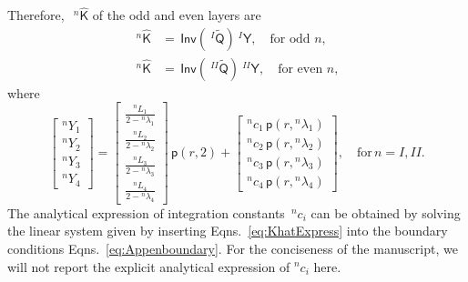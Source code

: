 \documentclass[preprint,10pt,times]{elsarticle}
\numberwithin{equation}{section}
\renewcommand{\u}[1]{\boldsymbol{#1}}
\newcommand{\usf}[1]{\u{\mathsf #1}}
\newcommand{\pr}[1]{\left( #1 \right)}
\newcommand{\p}{\,\mathsf{p}}
\newcommand{\Inv}{\,\mathsf{Inv}}
\renewcommand{\>}{$\Rightarrow$}
\begin{document}
Therefore,~$~^{n}{\hat{\usf{K}}}$ of the odd and even layers are
\begin{subequations}
\begin{align}
~^{n}{\hat{\usf{K}}} & = \Inv\left( ~^{I}\tilde{\usf{Q}} \right) ~^{I}\usf{Y}, \quad \text{for odd~$n$}, \\
~^{n}{\hat{\usf{K}}} & = \Inv\left( ~^{II}\tilde{\usf{Q}} \right) ~^{II}\usf{Y}, \quad \text{for even~$n$},
\end{align}
\label{eq:KhatExpress}
\end{subequations}
where
\begin{equation}
	\begin{bmatrix}
	 {}^{n}\!{Y_{1}} \\ {}^{n}\!{Y_{2}} \\ {}^{n}\!{Y_{3}} \\ {}^{n}\!{Y_{4}}
	\end{bmatrix}
	=
	\begin{bmatrix}
	 \frac{{}^{n}\!{L_{1}}}{2-{}^{n}\!{\lambda_{1}}} \\ \frac{{}^{n}\!{L_{2}}}{2-{}^{n}\!{\lambda_{2}}} \\ \frac{{}^{n}\!{L_{3}}}{2-{}^{n}\!{\lambda_{3}}} \\ \frac{{}^{n}\!{L_{4}}}{2-{}^{n}\!{\lambda_{4}}}
	\end{bmatrix}\p\pr{r,2}
	+
	\begin{bmatrix}
	 {}^{n}\!{c_{1}} \p\pr{r,{}^{n}\!{\lambda_{1}}} \\ {}^{n}\!{c_{2}} \p\pr{r,{}^{n}\!{\lambda_{2}}} \\ {}^{n}\!{c_{3}} \p\pr{r,{}^{n}\!{\lambda_{3}}} \\ {}^{n}\!{c_{4}} \p\pr{r,{}^{n}\!{\lambda_{4}}}
	\end{bmatrix}, \quad \text{for} \, n = I, II.
\end{equation}
The analytical expression of integration constants~${}^{n}\!{c_{i}}$ can be obtained by solving the linear system given by inserting Eqns.~\eqref{eq:KhatExpress} into the boundary conditions Eqns.~\eqref{eq:Appenboundary}. For the conciseness of the manuscript, we will not report the explicit analytical expression of ${}^{n}\!{c_{i}}$ here.
\end{document}
